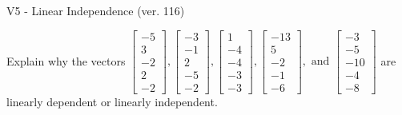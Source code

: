 \begin{exercise}
  \begin{exerciseTitle}V5 - Linear Independence (ver. 116)\end{exerciseTitle}
  \begin{exerciseStatement}
    Explain why the vectors \(\left[\begin{array}{r}
-5 \\
3 \\
-2 \\
2 \\
-2
\end{array}\right] , \left[\begin{array}{r}
-3 \\
-1 \\
2 \\
-5 \\
-2
\end{array}\right] , \left[\begin{array}{r}
1 \\
-4 \\
-4 \\
-3 \\
-3
\end{array}\right] , \left[\begin{array}{r}
-13 \\
5 \\
-2 \\
-1 \\
-6
\end{array}\right] , \text{ and } \left[\begin{array}{r}
-3 \\
-5 \\
-10 \\
-4 \\
-8
\end{array}\right]\) are linearly dependent or linearly independent.	



\end{exerciseStatement}
\end{exercise}
